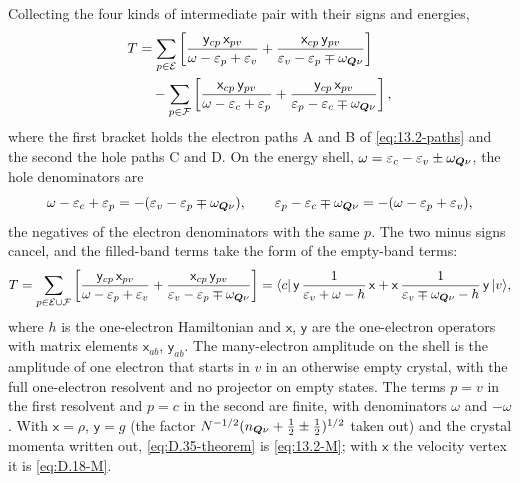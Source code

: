Collecting the four kinds of intermediate pair with their signs and energies,
\begin{equation*}
  \begin{aligned}
  T &= \sum_{p\in\mathcal{E}}\left[\frac{\mathsf{y}_{cp}\,\mathsf{x}_{pv}}{\omega - \varepsilon_p + \varepsilon_v} + \frac{\mathsf{x}_{cp}\,\mathsf{y}_{pv}}{\varepsilon_v - \varepsilon_p \mp \omega_{\bm{Q}\nu}}\right] \\
  &\quad - \sum_{p\in\mathcal{F}}\left[\frac{\mathsf{x}_{cp}\,\mathsf{y}_{pv}}{\omega - \varepsilon_c + \varepsilon_p} + \frac{\mathsf{y}_{cp}\,\mathsf{x}_{pv}}{\varepsilon_p - \varepsilon_c \mp \omega_{\bm{Q}\nu}}\right] ,
  \end{aligned}
\end{equation*}
where the first bracket holds the electron paths A and B of \cref{eq:13.2-paths} and the second the hole paths C and D. On the energy shell, $\omega = \varepsilon_c - \varepsilon_v \pm \omega_{\bm{Q}\nu}$, the hole denominators are
\begin{equation*}
  \omega - \varepsilon_c + \varepsilon_p = -(\varepsilon_v - \varepsilon_p \mp \omega_{\bm{Q}\nu}) , \qquad
  \varepsilon_p - \varepsilon_c \mp \omega_{\bm{Q}\nu} = -(\omega - \varepsilon_p + \varepsilon_v) ,
\end{equation*}
the negatives of the electron denominators with the same $p$. The two minus signs cancel, and the filled-band terms take the form of the empty-band terms:
\begin{equation}
  T = \sum_{p\in\mathcal{E}\cup\mathcal{F}}\left[\frac{\mathsf{y}_{cp}\,\mathsf{x}_{pv}}{\omega - \varepsilon_p + \varepsilon_v} + \frac{\mathsf{x}_{cp}\,\mathsf{y}_{pv}}{\varepsilon_v - \varepsilon_p \mp \omega_{\bm{Q}\nu}}\right]
  = \langle c|\,\mathsf{y}\,\frac{1}{\varepsilon_v + \omega - h}\,\mathsf{x} + \mathsf{x}\,\frac{1}{\varepsilon_v \mp \omega_{\bm{Q}\nu} - h}\,\mathsf{y}\,|v\rangle ,
  \label{eq:D.35-theorem}
\end{equation}
where $h$ is the one-electron Hamiltonian and $\mathsf{x}$, $\mathsf{y}$ are the one-electron operators with matrix elements $\mathsf{x}_{ab}$, $\mathsf{y}_{ab}$. The many-electron amplitude on the shell is the amplitude of one electron that starts in $v$ in an otherwise empty crystal, with the full one-electron resolvent and no projector on empty states. The terms $p = v$ in the first resolvent and $p = c$ in the second are finite, with denominators $\omega$ and $-\omega$. With $\mathsf{x} = \rho$, $\mathsf{y} = g$ (the factor $N^{-1/2}(n_{\bm{Q}\nu} + \frac12 \pm \frac12)^{1/2}$ taken out) and the crystal momenta written out, \cref{eq:D.35-theorem} is \cref{eq:13.2-M}; with $\mathsf{x}$ the velocity vertex it is \cref{eq:D.18-M}.


